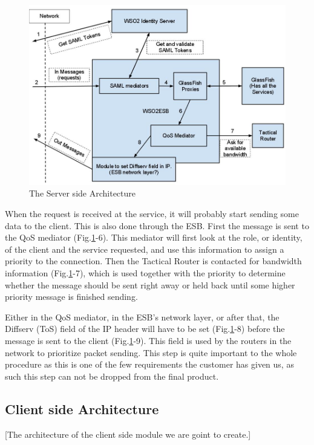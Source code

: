 \documentclass[12pt]{article}
\begin{document}
        \begin{figure}[htb]
            \includegraphics[scale=0.4]{serverside}
            \caption{The Server side Architecture}
            \label{fig:serverside}
        \end{figure}

        When the request is received at the service, it will probably start sending some data to the client. This is also done through the ESB. First the message is sent to the QoS mediator (Fig.\ref{fig:serverside}-6). This mediator will first look at the role, or identity, of the client and the service requested, and use this information to assign a priority to the connection. Then the Tactical Router is contacted for bandwidth information (Fig.\ref{fig:serverside}-7), which is used together with the priority to determine whether the message should be sent right away or held back until some higher priority message is finished sending.

        Either in the QoS mediator, in the ESB’s network layer, or after that, the Diffserv (ToS) field of the IP header will have to be set (Fig.\ref{fig:serverside}-8) before the message is sent to the client (Fig.\ref{fig:serverside}-9). This field is used by the routers in the network to prioritize packet sending. This step is quite important to the whole procedure as this is one of the few requirements the customer has given us, as such this step can not be dropped from the final product.
 
    \subsection{Client side Architecture}\label{clientsidearch} [The architecture of the client side module we are goint to create.] 
    
\end{document}
